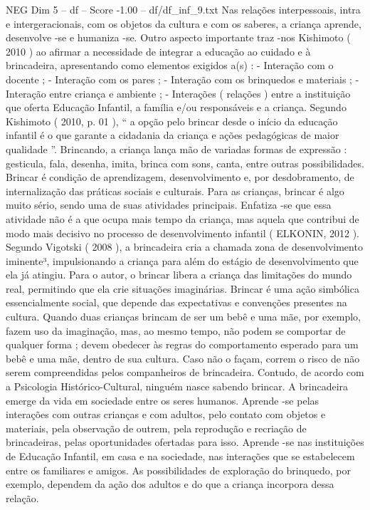 \begin{textsample}{NEG Dim 5 – df – Score -1.00 – df/df\_inf\_9.txt}
Nas relações interpessoais, intra e intergeracionais, com os objetos da cultura e com os saberes, a criança aprende, desenvolve -se e humaniza -se.
Outro aspecto importante traz -nos Kishimoto ( 2010 ) ao afirmar a necessidade de integrar a educação ao cuidado e à brincadeira, apresentando como elementos exigidos a(s) : - Interação com o docente ; - Interação com os pares ; - Interação com os brinquedos e materiais ; - Interação entre criança e ambiente ; - Interações ( relações ) entre a instituição que oferta Educação Infantil, a família e/ou responsáveis e a criança.
Segundo Kishimoto ( 2010, p. 01 ), “ a opção pelo brincar desde o início da educação infantil é o que garante a cidadania da criança e ações pedagógicas de maior qualidade ”.
Brincando, a criança lança mão de variadas formas de expressão : gesticula, fala, desenha, imita, brinca com sons, canta, entre outras possibilidades.
Brincar é condição de aprendizagem, desenvolvimento e, por desdobramento, de internalização das práticas sociais e culturais.
Para as crianças, brincar é algo muito sério, sendo uma de suas atividades principais.
Enfatiza -se que essa atividade não é a que ocupa mais tempo da criança, mas aquela que contribui de modo mais decisivo no processo de desenvolvimento infantil ( ELKONIN, 2012 ).
Segundo Vigotski ( 2008 ), a brincadeira cria a chamada zona de desenvolvimento iminente³, impulsionando a criança para além do estágio de desenvolvimento que ela já atingiu.
Para o autor, o brincar libera a criança das limitações do mundo real, permitindo que ela crie situações imaginárias.
Brincar é uma ação simbólica essencialmente social, que depende das expectativas e convenções presentes na cultura.
Quando duas crianças brincam de ser um bebê e uma mãe, por exemplo, fazem uso da imaginação, mas, ao mesmo tempo, não podem se comportar de qualquer forma ; devem obedecer às regras do comportamento esperado para um bebê e uma mãe, dentro de sua cultura.
Caso não o façam, correm o risco de não serem compreendidas pelos companheiros de brincadeira.
Contudo, de acordo com a Psicologia Histórico-Cultural, ninguém nasce sabendo brincar.
A brincadeira emerge da vida em sociedade entre os seres humanos.
Aprende -se pelas interações com outras crianças e com adultos, pelo contato com objetos e materiais, pela observação de outrem, pela reprodução e recriação de brincadeiras, pelas oportunidades ofertadas para isso.
Aprende -se nas instituições de Educação Infantil, em casa e na sociedade, nas interações que se estabelecem entre os familiares e amigos.
As possibilidades de exploração do brinquedo, por exemplo, dependem da ação dos adultos e do que a criança incorpora dessa relação.

\end{textsample}

